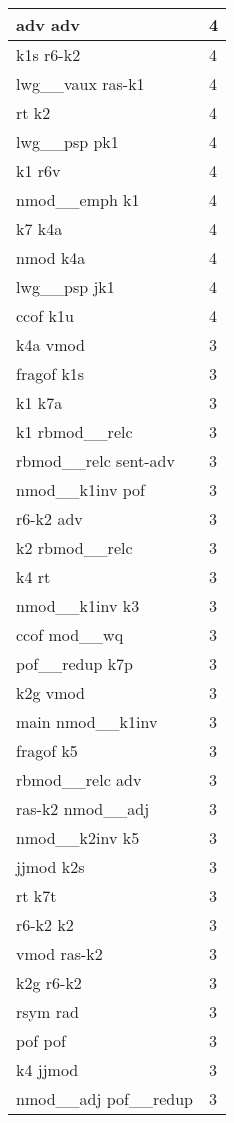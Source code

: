 \documentclass[a4 paper]{article}
\begin{document}
\begin{longtable}{p{}p{}}
adv adv  & 4 \\ \midrule
k1s r6-k2  & 4 \\ \midrule
lwg\_\_vaux ras-k1  & 4 \\ \midrule
rt k2  & 4 \\ \midrule
lwg\_\_psp pk1  & 4 \\ \midrule
k1 r6v  & 4 \\ \midrule
nmod\_\_emph k1  & 4 \\ \midrule
k7 k4a  & 4 \\ \midrule
nmod k4a  & 4 \\ \midrule
lwg\_\_psp jk1  & 4 \\ \midrule
ccof k1u  & 4 \\ \midrule
k4a vmod  & 3 \\ \midrule
fragof k1s  & 3 \\ \midrule
k1 k7a  & 3 \\ \midrule
k1 rbmod\_\_relc  & 3 \\ \midrule
rbmod\_\_relc sent-adv  & 3 \\ \midrule
nmod\_\_k1inv pof  & 3 \\ \midrule
r6-k2 adv  & 3 \\ \midrule
k2 rbmod\_\_relc  & 3 \\ \midrule
k4 rt  & 3 \\ \midrule
nmod\_\_k1inv k3  & 3 \\ \midrule
ccof mod\_\_wq  & 3 \\ \midrule
pof\_\_redup k7p  & 3 \\ \midrule
k2g vmod  & 3 \\ \midrule
main nmod\_\_k1inv  & 3 \\ \midrule
fragof k5  & 3 \\ \midrule
rbmod\_\_relc adv  & 3 \\ \midrule
ras-k2 nmod\_\_adj  & 3 \\ \midrule
nmod\_\_k2inv k5  & 3 \\ \midrule
jjmod k2s  & 3 \\ \midrule
rt k7t  & 3 \\ \midrule
r6-k2 k2  & 3 \\ \midrule
vmod ras-k2  & 3 \\ \midrule
k2g r6-k2  & 3 \\ \midrule
rsym rad  & 3 \\ \midrule
pof pof  & 3 \\ \midrule
k4 jjmod  & 3 \\ \midrule
nmod\_\_adj pof\_\_redup  & 3 \\ \midrule

\end{longtable}
\end{document}
